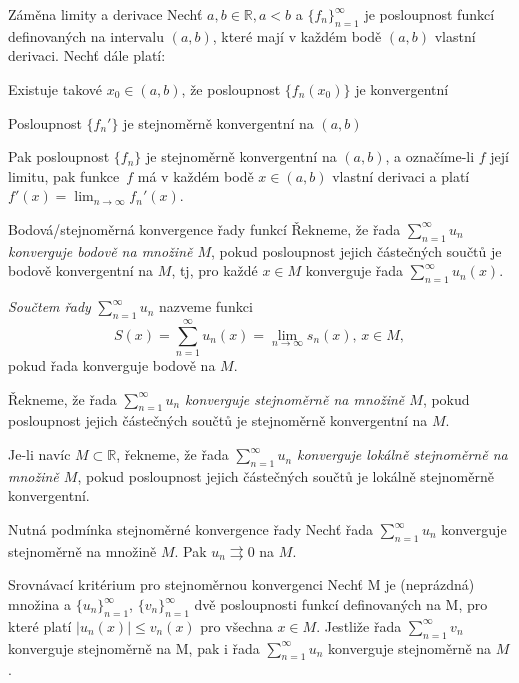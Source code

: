 \begin{vetaN}{Záměna limity a derivace}
Nechť $a, b \in \mathbb{R}, a<b$ a $\{f_n\}_{n=1}^{\infty}$ je posloupnost funkcí definovaných na intervalu $(a, b)$, které mají v každém bodě $(a,b)$ vlastní derivaci. Nechť dále platí:
\begin{penumerate}
	\item Existuje takové $x_0 \in (a,b)$, že posloupnost $\{f_n(x_0)\}$ je konvergentní
	\item Posloupnost $\{f_n'\}$ je stejnoměrně konvergentní na $(a,b)$
\end{penumerate}
Pak posloupnost $\{f_n\}$ je stejnoměrně konvergentní na $(a,b)$, a označíme-li $f$ její limitu, pak funkce $f$ má v každém bodě $x \in (a,b)$ vlastní derivaci a platí $f'(x) = \lim_{n \rightarrow \infty} f_n'(x)$.
\end{vetaN}

\begin{definiceN}{Bodová/stejnoměrná konvergence řady funkcí}
Řekneme, že řada $\sum_{n=1}^{\infty} u_n$ \emph{konverguje bodově na množině $M$}, pokud posloupnost jejich částečných součtů je bodově konvergentní na $M$, tj, pro každé $x \in M$ konverguje řada $\sum_{n=1}^{\infty} u_n(x)$.

\emph{Součtem řady} $\sum_{n=1}^{\infty} u_n$ nazveme funkci
$$S(x) = \sum_{n=1}^{\infty} u_n(x) = \lim_{n \rightarrow \infty} s_n(x), \, x \in M,$$
pokud řada konverguje bodově na $M$.

Řekneme, že řada $\sum_{n=1}^{\infty} u_n$ \emph{konverguje stejnoměrně na množině $M$}, pokud posloupnost jejich částečných součtů je stejnoměrně konvergentní na $M$.

Je-li navíc $M \subset \mathbb{R}$, řekneme, že řada $\sum_{n=1}^{\infty} u_n$ \emph{konverguje lokálně stejnoměrně na množině $M$}, pokud posloupnost jejich částečných součtů je lokálně stejnoměrně konvergentní.
\end{definiceN}

\begin{vetaN}{Nutná podmínka stejnoměrné konvergence řady}
Nechť řada $\sum_{n=1}^{\infty} u_n$ konverguje stejnoměrně na množině $M$. Pak $u_n \rightrightarrows 0$ na $M$.
\end{vetaN}

\begin{vetaN}{Srovnávací kritérium pro stejnoměrnou konvergenci}
Nechť M je (neprázdná) množina a $\{u_n\}_{n=1}^{\infty}$, $\{v_n\}_{n=1}^{\infty}$ dvě posloupnosti funkcí definovaných na M, pro které platí $|u_n(x)| \le v_n(x)$ pro všechna $x \in M$. Jestliže řada $\sum_{n=1}^{\infty} v_n$ konverguje stejnoměrně na M, pak i řada $\sum_{n=1}^{\infty} u_n$ konverguje stejnoměrně na $M$.
\end{vetaN}

